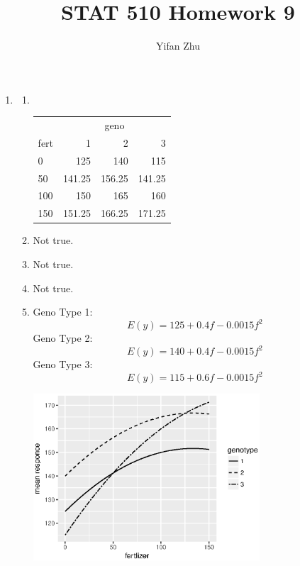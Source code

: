 \documentclass{article}
\begin{document}
\setcounter{MaxMatrixCols}{20}



\title{STAT 510 Homework 9}
\author{Yifan Zhu}
\maketitle

\begin{enumerate}[leftmargin = 0 em, label = \arabic*., font = \bfseries]
	\item
	\begin{enumerate}
		\item \ 

		\begin{tabular}{l|rrr}
		\toprule
			& \multicolumn{3}{c}{geno}\\
			fert & 1 & 2 & 3\\
			\hline
			0 & 125 & 140 & 115\\
			50 & 141.25 & 156.25 & 141.25\\
			100 & 150 & 165 & 160 \\
			150 & 151.25 & 166.25 & 171.25\\
			\bottomrule
		\end{tabular}

		\item 
		Not true.
		\item 
		Not true.
		\item 
		Not true.
		\item 
		Geno Type 1:
		\[ E(y) = 125 + 0.4 f -0.0015 f^2\]
		Geno Type 2:
		\[ E(y) = 140 + 0.4 f - 0.0015 f^2\]
		Geno Type 3:
		\[ E(y) = 115 + 0.6 f - 0.0015 f^2\]

		\begin{center}
			\includegraphics[width = 0.7\textwidth]{Rplot.eps}
		\end{center}


\end{enumerate}
\end{enumerate}
\end{document}
